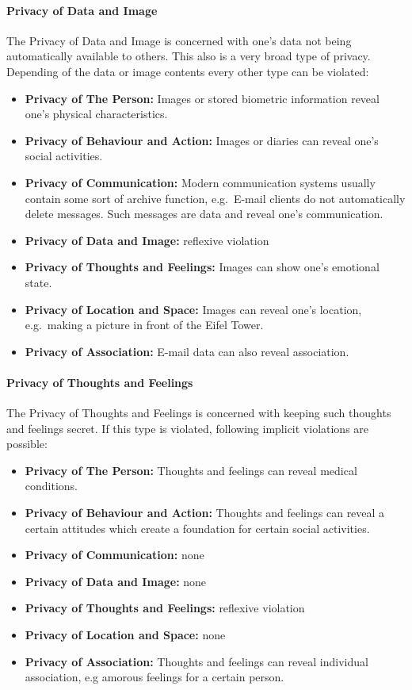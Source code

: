 \paragraph*{Privacy of Data and Image}

The Privacy of Data and Image is concerned with one's data not being
automatically available to others. This also is a very broad type of
privacy. Depending of the data or image contents every other type can be
violated:

\begin{itemize}

\item
  \textbf{Privacy of The Person:} Images or stored biometric information
  reveal one's physical characteristics.
\item
  \textbf{Privacy of Behaviour and Action:} Images or diaries can reveal
  one's social activities.
\item
  \textbf{Privacy of Communication:} Modern communication systems
  usually contain some sort of archive function, e.g.~E-mail clients do
  not automatically delete messages. Such messages are data and reveal
  one's communication.
\item
  \textbf{Privacy of Data and Image:} reflexive violation
\item
  \textbf{Privacy of Thoughts and Feelings:} Images can show one's
  emotional state.
\item
  \textbf{Privacy of Location and Space:} Images can reveal one's
  location, e.g.~making a picture in front of the Eifel Tower.
\item
  \textbf{Privacy of Association:} E-mail data can also reveal
  association.
\end{itemize}

\paragraph*{Privacy of Thoughts and Feelings}

The Privacy of Thoughts and Feelings is concerned with keeping such
thoughts and feelings secret. If this type is violated, following
implicit violations are possible:

\begin{itemize}

\item
  \textbf{Privacy of The Person:} Thoughts and feelings can reveal
  medical conditions.
\item
  \textbf{Privacy of Behaviour and Action:} Thoughts and feelings can
  reveal a certain attitudes which create a foundation for certain
  social activities.
\item
  \textbf{Privacy of Communication:} none
\item
  \textbf{Privacy of Data and Image:} none
\item
  \textbf{Privacy of Thoughts and Feelings:} reflexive violation
\item
  \textbf{Privacy of Location and Space:} none
\item
  \textbf{Privacy of Association:} Thoughts and feelings can reveal
  individual association, e.g amorous feelings for a certain person.
\end{itemize}

